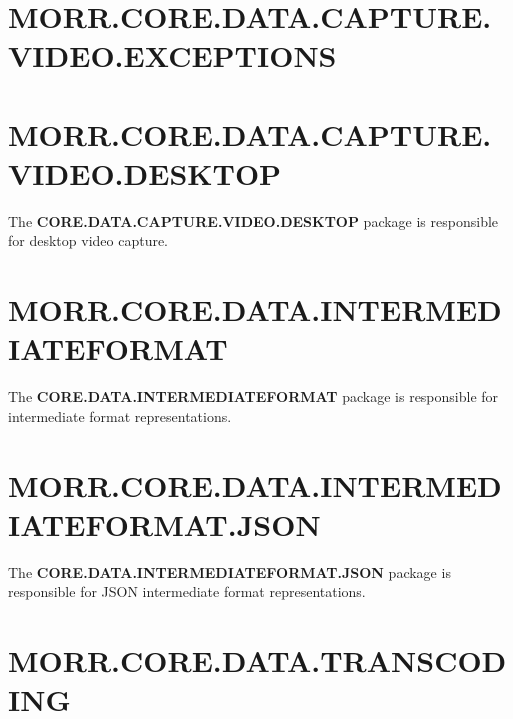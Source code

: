 \section*{MORR.CORE.DATA.CAPTURE.VIDEO.EXCEPTIONS}

\begin{packclass}
\end{packclass}

\section*{MORR.CORE.DATA.CAPTURE.VIDEO.DESKTOP}

The \textbf{CORE.DATA.CAPTURE.VIDEO.DESKTOP} package is responsible for desktop video capture.

\begin{packclass}
\end{packclass}

\section*{MORR.CORE.DATA.INTERMEDIATEFORMAT}

The \textbf{CORE.DATA.INTERMEDIATEFORMAT} package is responsible for intermediate format representations.

\begin{packclass}
\end{packclass}

\begin{packpack}
\end{packpack}

\section*{MORR.CORE.DATA.INTERMEDIATEFORMAT.JSON}

The \textbf{CORE.DATA.INTERMEDIATEFORMAT.JSON} package is responsible for JSON intermediate format representations.

\begin{packclass}
\end{packclass}

\section*{MORR.CORE.DATA.TRANSCODING}

